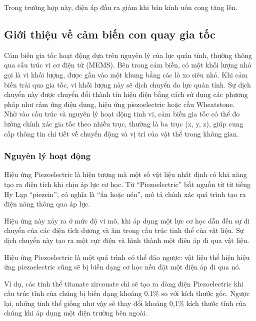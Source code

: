 \indent Trong trường hợp này, điện áp đầu ra giảm khi bán kính uốn cong tăng lên.
\subsection{Giới thiệu về cảm biến con quay gia tốc}
\indent Cảm biến gia tốc hoạt động dựa trên nguyên lý của lực quán tính, thường thông qua cấu trúc vi cơ điện tử (MEMS). Bên trong cảm biến, có một khối lượng nhỏ gọi là vi khối lượng, được gắn vào một khung bằng các lò xo siêu nhỏ. Khi cảm biến trải qua gia tốc, vi khối lượng này sẽ dịch chuyển do lực quán tính. Sự dịch chuyển này được chuyển đổi thành tín hiệu điện bằng cách sử dụng các phương pháp như cảm ứng điện dung, hiệu ứng piezoelectric hoặc cầu Wheatstone.\\
\indent Nhờ vào cấu trúc và nguyên lý hoạt động tinh vi, cảm biến gia tốc có thể đo lường chính xác gia tốc theo nhiều trục, thường là ba trục (x, y, z), giúp cung cấp thông tin chi tiết về chuyển động và vị trí của vật thể trong không gian.
\subsubsection{Nguyên lý hoạt động}
\indent Hiệu ứng Piezoelectric là hiện tượng mà một số vật liệu nhất định có khả năng tạo ra điện tích khi chịu áp lực cơ học. Từ “Piezoelectric” bắt nguồn từ từ tiếng Hy Lạp “piezein”, có nghĩa là “ấn hoặc nén”, mô tả chính xác quá trình tạo ra điện năng thông qua áp lực.

\indent Hiệu ứng này xảy ra ở mức độ vi mô, khi áp dụng một lực cơ học dẫn đến sự di chuyển của các điện tích dương và âm trong cấu trúc tinh thể của vật liệu. Sự dịch chuyển này tạo ra một cực điện và hình thành một điên áp đi qua vật liệu.

\indent Hiệu ứng Piezoelectric là một quá trình có thể đảo ngược: vật liệu thể hiện hiệu ứng piezoelectric cũng sẽ bị biến dạng cơ học nếu đặt một điện áp đi qua nó.

Ví dụ, các tinh thể titanate zirconate chì sẽ tạo ra dòng điện Piezoelectric khi cấu trúc tĩnh của chúng bị biến dạng khoảng 0,1\% so với kích thước gốc. Ngược lại, những tinh thể giống như vậy sẽ thay đổi khoảng 0,1\% kích thước tĩnh của chúng khi áp dụng một điện trường bên ngoài.

